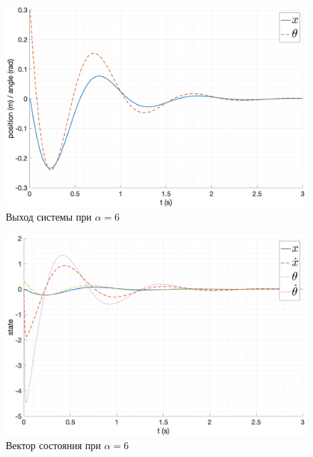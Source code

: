 \begin{figure}[ht!]
    \centering
    \includegraphics[width=\textwidth]{media/plots/nonmodal_controllers/out_3.png}
    \caption{Выход системы при $\alpha = 6$}
    \label{fig:nonmodal_control_alpha_3}
\end{figure}
\begin{figure}[ht!]
    \centering
    \includegraphics[width=\textwidth]{media/plots/nonmodal_controllers/state_3.png}
    \caption{Вектор состояния при $\alpha = 6$}
    \label{fig:nonmodal_control_alpha_3_u}
\end{figure}
